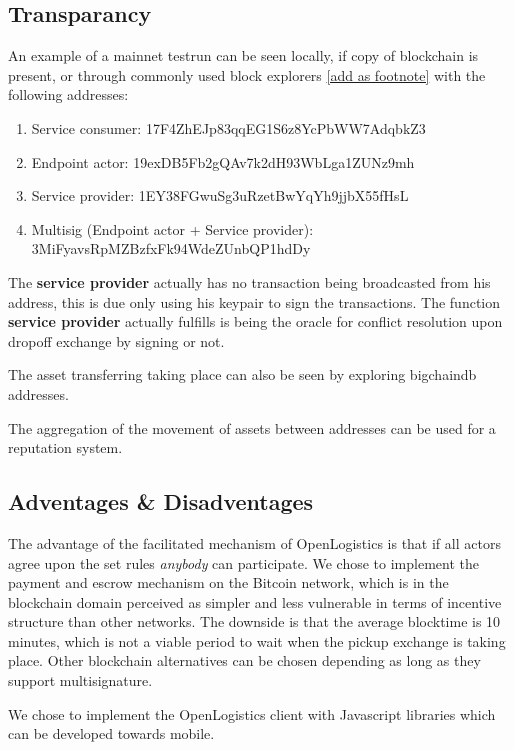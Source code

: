 \subsection{Transparancy}

An example of a mainnet testrun can be seen locally, if copy of blockchain is present, or through commonly used block explorers \href{https://www.blocktrail.com/BTC}{[add as footnote]}
 with the following addresses:
\begin{enumerate}
  \item Service consumer: 17F4ZhEJp83qqEG1S6z8YcPbWW7AdqbkZ3
  \item Endpoint actor: 19exDB5Fb2gQAv7k2dH93WbLga1ZUNz9mh
  \item Service provider: 1EY38FGwuSg3uRzetBwYqYh9jjbX55fHsL
  \item Multisig (Endpoint actor + Service provider): 3MiFyavsRpMZBzfxFk94WdeZUnbQP1hdDy
\end{enumerate}

The \textbf{service provider} actually has no transaction being broadcasted from his address, this is due only using his keypair to sign the transactions. The function \textbf{service provider} actually fulfills is being the oracle for conflict resolution upon dropoff exchange by signing or not.\par
The asset transferring taking place can also be seen by exploring bigchaindb addresses. \par
The aggregation of the movement of assets between addresses can be used for a reputation system.

%

\subsection{Adventages \& Disadventages}

The advantage of the facilitated mechanism of OpenLogistics is that if all actors agree upon the set rules \textit{anybody} can participate. We chose to implement the payment and escrow mechanism on the Bitcoin network, which is in the blockchain domain perceived as simpler and less vulnerable in terms of incentive structure than other networks. The downside is that the average blocktime is 10 minutes, which is not a viable period to wait when the pickup exchange is taking place. Other blockchain alternatives can be chosen depending as long as they support multisignature. \par
We chose to implement the OpenLogistics client with Javascript libraries which can be developed towards mobile. 

